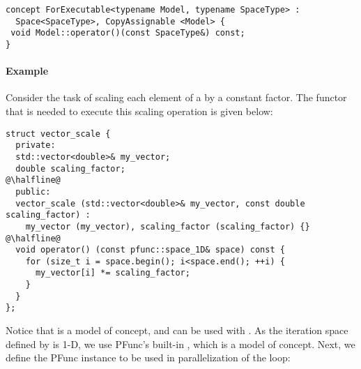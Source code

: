 \begin{center}
\begin{minipage}{0.6\textwidth}
\begin{lstlisting}
concept ForExecutable<typename Model, typename SpaceType> : 
  Space<SpaceType>, CopyAssignable <Model> {
 void Model::operator()(const SpaceType&) const;
}
\end{lstlisting}
\end{minipage}
\end{center}

\paragraph{Example} Consider the task of scaling each element of a 
 by a constant factor.
%
The functor that is needed to execute this scaling operation is given below:
%
\begin{center}
\begin{minipage}{0.8\textwidth}
\begin{lstlisting}
struct vector_scale {
  private:
  std::vector<double>& my_vector;
  double scaling_factor;
@\halfline@
  public:
  vector_scale (std::vector<double>& my_vector, const double scaling_factor) :
    my_vector (my_vector), scaling_factor (scaling_factor) {}
@\halfline@
  void operator() (const pfunc::space_1D& space) const {
    for (size_t i = space.begin(); i<space.end(); ++i) {
      my_vector[i] *= scaling_factor;
    }
  }
};
\end{lstlisting}
\end{minipage}
\end{center}
%
Notice that  is a model of  concept,
and can be used with .
%
As the iteration space defined by  is 1-D, we use PFunc's 
built-in , which is a model of  concept.
%
Next, we define the PFunc instance to be used in parallelization of the
 loop:

